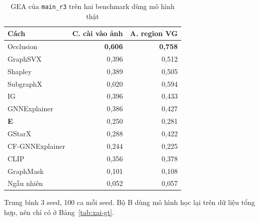 \begin{table}[t]
  \caption{GEA của \texttt{main\_r3} trên hai benchmark dùng mô hình thật}
  \label{tab:xai-gt-mainr3}
  \centering
  \footnotesize
  \begin{tabular}{@{}lrr@{}}
    \toprule
    Cách & C. cài vào ảnh & A. region VG \\
    \midrule
    Occlusion & \textbf{0,606} & \textbf{0,758} \\
    GraphSVX & 0,396 & 0,512 \\
    Shapley & 0,389 & 0,505 \\
    SubgraphX & 0,020 & 0,594 \\
    IG & 0,396 & 0,433 \\
    GNNExplainer & 0,386 & 0,427 \\
    \textbf{E} & 0,250 & 0,281 \\
    GStarX & 0,288 & 0,422 \\
    CF-GNNExplainer & 0,244 & 0,225 \\
    CLIP & 0,356 & 0,378 \\
    GraphMask & 0,101 & 0,108 \\
    Ngẫu nhiên & 0,052 & 0,057 \\
    \bottomrule
  \end{tabular}
  \par\smallskip
  {\scriptsize\raggedright
    Trung bình 3 seed, 100 ca mỗi seed. Bộ B dùng mô hình học lại trên dữ liệu tổng hợp, nên chỉ có ở Bảng~\ref{tab:xai-gt}.\par}
\end{table}

